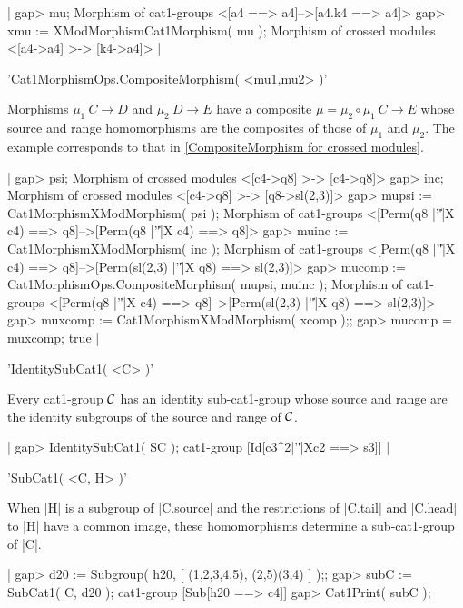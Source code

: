 |    gap> mu;
    Morphism of cat1-groups <[a4 ==> a4]-->[a4.k4 ==> a4]>
    gap> xmu := XModMorphismCat1Morphism( mu );
    Morphism of crossed modules <[a4->a4] >-> [k4->a4]>   |

%

'Cat1MorphismOps.CompositeMorphism( <mu1,mu2> )'

Morphisms  $\mu_1 \: C \to D$  and  $\mu_2 \: D \to E$
have a composite  $\mu = \mu_2 \circ \mu_1 \: C \to E$
whose source and range homomorphisms are the composites of those
of  $\mu_1$  and  $\mu_2$.
The example corresponds to that in 
\ref{CompositeMorphism for crossed modules}.

|    gap> psi;
    Morphism of crossed modules <[c4->q8] >-> [c4->q8]>
    gap> inc;
    Morphism of crossed modules <[c4->q8] >-> [q8->sl(2,3)]>
    gap> mupsi := Cat1MorphismXModMorphism( psi );
    Morphism of cat1-groups
        <[Perm(q8 |'\|'|X c4) ==> q8]-->[Perm(q8 |'\|'|X c4) ==> q8]>
    gap> muinc := Cat1MorphismXModMorphism( inc );
    Morphism of cat1-groups
        <[Perm(q8 |'\|'|X c4) ==> q8]-->[Perm(sl(2,3) |'\|'|X q8) ==> sl(2,3)]>
    gap> mucomp := Cat1MorphismOps.CompositeMorphism( mupsi, muinc );
    Morphism of cat1-groups
        <[Perm(q8 |'\|'|X c4) ==> q8]-->[Perm(sl(2,3) |'\|'|X q8) ==> sl(2,3)]>
    gap> muxcomp := Cat1MorphismXModMorphism( xcomp );;
    gap> mucomp = muxcomp;
    true   |


'IdentitySubCat1( <C> )'

Every cat1-group ${\cal C}$ has an identity sub-cat1-group whose source and
range are the identity subgroups of the source and range of ${\cal C}$.

|    gap> IdentitySubCat1( SC );
    cat1-group [Id[c3^2|'\|'|Xc2 ==> s3]]  | 

%

'SubCat1( <C, H> )'

When |H| is a subgroup of |C.source| and the restrictions of
|C.tail| and |C.head| to |H| have a common image, these homomorphisms
determine a sub-cat1-group of |C|.

|    gap> d20 := Subgroup( h20, [ (1,2,3,4,5), (2,5)(3,4) ] );;
    gap> subC := SubCat1( C, d20 );
    cat1-group [Sub[h20 ==> c4]] 
    gap> Cat1Print( subC );

